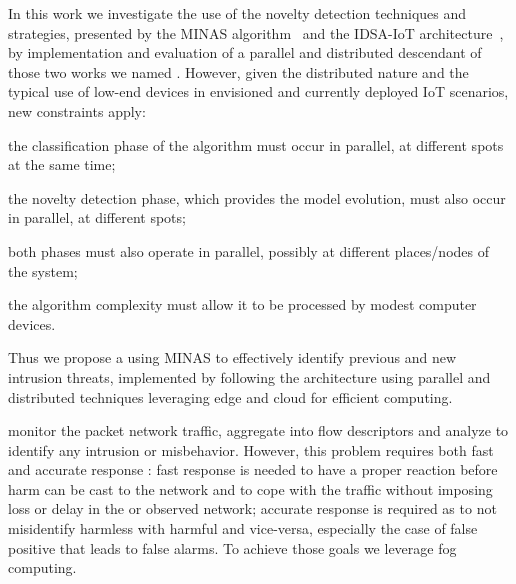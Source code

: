 In this work we investigate the use of the novelty detection techniques and strategies,
presented by the MINAS algorithm~\cite{MINAS} and the IDSA-IoT architecture~\cite{Cassales2019a},
by implementation and evaluation of a parallel and distributed descendant of those two works
we named \mfog.
However, given the distributed nature and the typical use of 
low-end devices in envisioned and currently deployed IoT scenarios,  
new constraints apply:
\begin{enumerate*}[label=(\emph{\roman*})]
    \item the classification phase of the algorithm must occur in parallel,
    at different spots at the same time;
    \item the novelty detection phase, which provides the model evolution,
    must also occur in parallel, at different spots;
    \item both phases must also operate in parallel,
    possibly at different places/nodes of the system;
    \item the algorithm complexity must allow it to be processed by modest computer devices.
\end{enumerate*}



Thus we propose a \nids using MINAS \cite{Faria2016minas}
to effectively identify previous and new intrusion threats,
implemented by following the  architecture \cite{Cassales2019a} using parallel and distributed techniques leveraging
edge and cloud for efficient computing.

\nids 
monitor the packet network traffic, aggregate into flow descriptors and
analyze to identify any intrusion or misbehavior.
However, this problem requires both fast and accurate response \cite{DaCosta2019a}:
fast response is needed to have a proper reaction before harm can be cast
to the network and to cope with the traffic without imposing loss or delay
in the \nids or observed network;
accurate response is required as to not misidentify harmless with harmful and vice-versa,
especially the case of false positive that leads to false alarms.
To achieve those goals we leverage fog computing.

